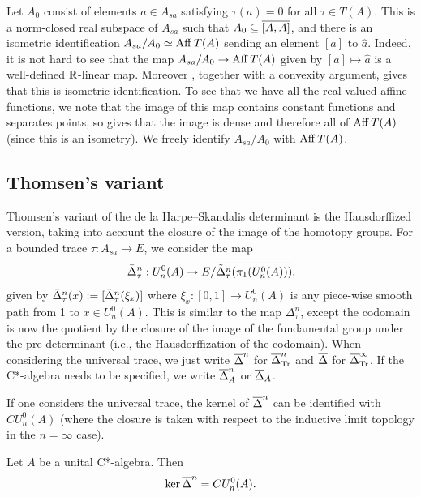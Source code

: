\documentclass[12pt]{amsart}
\begin{document}
  Let $A_0$ consist of elements $a \in A_{sa}$ satisfying $\tau(a) = 0$ for all $\tau \in T(A)$.
  This is a norm-closed real subspace of $A_{sa}$ such that $A_0 \subseteq \overline{[A,A]}$, and there is an isometric identification $A_{sa}/A_0 \simeq \operatorname{Aff} T(A)$ sending an element $[a]$ to $\widehat{a}$.
  Indeed, it is not hard to see that the map $A_{sa}/A_0 \to \operatorname{Aff} T(A)$ given by $[a] \mapsto \hat{a}$ is a well-defined $\mathbb{R}$-linear map.
  Moreover \cite[Theorem 2.9]{CuntzPedersen79}, together with a convexity argument, gives that this is isometric identification.
  To see that we have all the real-valued affine functions, we note that the image of this map contains constant functions and separates points, so \cite[Corollary 7.4]{Goodearlbook} gives that the image is dense and therefore all of $\operatorname{Aff} T(A)$ (since this is an isometry).
  We freely identify $A_{sa}/A_0$ with $\operatorname{Aff} T(A)$.

      \subsection{Thomsen's variant} Thomsen's variant of the de la Harpe--Skandalis determinant is the Hausdorffized version, taking into account the closure of the image of the homotopy groups. For a bounded trace $\tau: A_{sa} \to E$, we consider the map
      \begin{equation} \bar{\Delta}_\tau^n: U_n^0(A) \to E/\overline{\tilde{\Delta}_\tau^n(\pi_1(U_n^0(A)))}, \end{equation}
      given by $\bar{\Delta}_\tau^n(x) := [\tilde{\Delta}_\tau^n(\xi_x)]$ where $\xi_x: [0,1] \to U_n^0(A)$ is any piece-wise smooth path from 1 to $x \in U_n^0(A)$.
This is similar to the map $\Delta_\tau^n$, except the codomain is now the quotient by the closure of the image of the fundamental group under the pre-determinant (i.e., the Hausdorffization of the codomain).
When considering the universal trace, we just write $\overline\Delta^n$ for $\overline\Delta_{\text{Tr}}^n$ and $\overline\Delta$ for $\overline\Delta_{\text{Tr}}^{\infty}$. If the C*-algebra needs to be specified, we write $\overline\Delta_A^n$ or $\overline\Delta_A$.

If one considers the universal trace, the kernel of $\overline\Delta^n$ can be identified with $CU_n^0(A)$ (where the closure is taken with respect to the inductive limit topology in the $n = \infty$ case). 

\begin{lemma}
Let $A$ be a unital C*-algebra. Then
\begin{equation}
\ker \overline\Delta^n = CU_n^0(A).
\end{equation}
\end{lemma}
\end{document}
